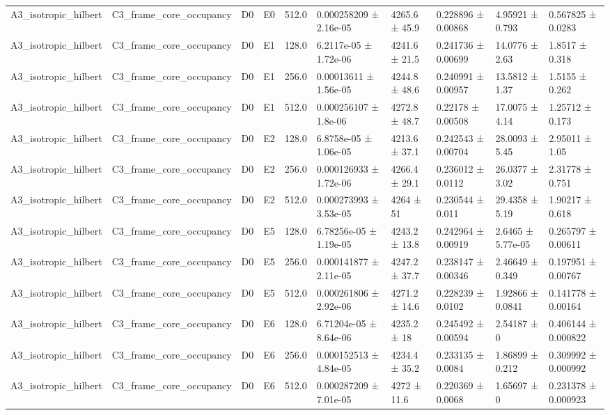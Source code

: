 \begin{table}
\begin{tabular}{llllllllll}
A3\_isotropic\_hilbert & C3\_frame\_core\_occupancy & D0 & E0 & 512.0 & 0.000258209 ± 2.16e-05 & 4265.6 ± 45.9 & 0.228896 ± 0.00868 & 4.95921 ± 0.793 & 0.567825 ± 0.0283 \\
A3\_isotropic\_hilbert & C3\_frame\_core\_occupancy & D0 & E1 & 128.0 & 6.2117e-05 ± 1.72e-06 & 4241.6 ± 21.5 & 0.241736 ± 0.00699 & 14.0776 ± 2.63 & 1.8517 ± 0.318 \\
A3\_isotropic\_hilbert & C3\_frame\_core\_occupancy & D0 & E1 & 256.0 & 0.00013611 ± 1.56e-05 & 4244.8 ± 48.6 & 0.240991 ± 0.00957 & 13.5812 ± 1.37 & 1.5155 ± 0.262 \\
A3\_isotropic\_hilbert & C3\_frame\_core\_occupancy & D0 & E1 & 512.0 & 0.000256107 ± 1.8e-06 & 4272.8 ± 48.7 & 0.22178 ± 0.00508 & 17.0075 ± 4.14 & 1.25712 ± 0.173 \\
A3\_isotropic\_hilbert & C3\_frame\_core\_occupancy & D0 & E2 & 128.0 & 6.8758e-05 ± 1.06e-05 & 4213.6 ± 37.1 & 0.242543 ± 0.00704 & 28.0093 ± 5.45 & 2.95011 ± 1.05 \\
A3\_isotropic\_hilbert & C3\_frame\_core\_occupancy & D0 & E2 & 256.0 & 0.000126933 ± 1.72e-06 & 4266.4 ± 29.1 & 0.236012 ± 0.0112 & 26.0377 ± 3.02 & 2.31778 ± 0.751 \\
A3\_isotropic\_hilbert & C3\_frame\_core\_occupancy & D0 & E2 & 512.0 & 0.000273993 ± 3.53e-05 & 4264 ± 51 & 0.230544 ± 0.011 & 29.4358 ± 5.19 & 1.90217 ± 0.618 \\
A3\_isotropic\_hilbert & C3\_frame\_core\_occupancy & D0 & E5 & 128.0 & 6.78256e-05 ± 1.19e-05 & 4243.2 ± 13.8 & 0.242964 ± 0.00919 & 2.6465 ± 5.77e-05 & 0.265797 ± 0.00611 \\
A3\_isotropic\_hilbert & C3\_frame\_core\_occupancy & D0 & E5 & 256.0 & 0.000141877 ± 2.11e-05 & 4247.2 ± 37.7 & 0.238147 ± 0.00346 & 2.46649 ± 0.349 & 0.197951 ± 0.00767 \\
A3\_isotropic\_hilbert & C3\_frame\_core\_occupancy & D0 & E5 & 512.0 & 0.000261806 ± 2.92e-06 & 4271.2 ± 14.6 & 0.228239 ± 0.0102 & 1.92866 ± 0.0841 & 0.141778 ± 0.00164 \\
A3\_isotropic\_hilbert & C3\_frame\_core\_occupancy & D0 & E6 & 128.0 & 6.71204e-05 ± 8.64e-06 & 4235.2 ± 18 & 0.245492 ± 0.00594 & 2.54187 ± 0 & 0.406144 ± 0.000822 \\
A3\_isotropic\_hilbert & C3\_frame\_core\_occupancy & D0 & E6 & 256.0 & 0.000152513 ± 4.84e-05 & 4234.4 ± 35.2 & 0.233135 ± 0.0084 & 1.86899 ± 0.212 & 0.309992 ± 0.000992 \\
A3\_isotropic\_hilbert & C3\_frame\_core\_occupancy & D0 & E6 & 512.0 & 0.000287209 ± 7.01e-05 & 4272 ± 11.6 & 0.220369 ± 0.0068 & 1.65697 ± 0 & 0.231378 ± 0.000923 \\

\end{tabular}
\end{table}
